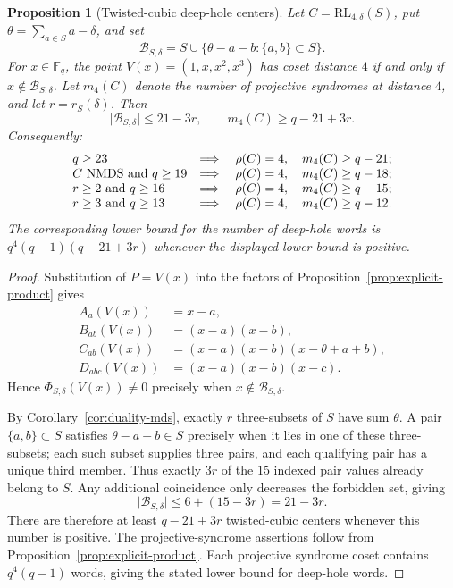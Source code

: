 \documentclass[11pt]{article}
\newcommand{\F}{\mathbb F}
\newcommand{\RL}{\mathrm{RL}}
\theoremstyle{plain}
\newtheorem{proposition}{Proposition}
\theoremstyle{definition}
\begin{document}
\begin{proposition}[Twisted-cubic deep-hole centers]
\label{prop:twisted-centers}
Let \(C=\RL_{4,\delta}(S)\), put
\(\theta=\sum_{a\in S}a-\delta\), and set
\[
 \mathcal{B}_{S,\delta}
 =S\cup\{\theta-a-b:\{a,b\}\subset S\}.
\]
For \(x\in\F_q\), the point \(V(x)=(1,x,x^2,x^3)\) has coset distance
\(4\) if and only if \(x\notin\mathcal{B}_{S,\delta}\).  Let \(m_4(C)\)
denote the number of projective syndromes at distance \(4\), and let
\(r=r_S(\delta)\).  Then
\[
  \lvert\mathcal{B}_{S,\delta}\rvert\le21-3r,\qquad
  m_4(C)\ge q-21+3r.
\]
Consequently:
\[
\begin{array}{ll}
q\ge23&\Longrightarrow\quad \rho(C)=4,\quad
 m_4(C)\ge q-21;\\
C\hbox{ NMDS and }q\ge19&\Longrightarrow\quad \rho(C)=4,\quad
 m_4(C)\ge q-18;\\
r\ge2\hbox{ and }q\ge16&\Longrightarrow\quad \rho(C)=4,\quad
 m_4(C)\ge q-15;\\
r\ge3\hbox{ and }q\ge13&\Longrightarrow\quad \rho(C)=4,\quad
 m_4(C)\ge q-12.
\end{array}
\]
The corresponding lower bound for the number of deep-hole words is
\(q^4(q-1)(q-21+3r)\) whenever the displayed lower bound is positive.
\end{proposition}

\begin{proof}
Substitution of \(P=V(x)\) into the factors of
Proposition~\ref{prop:explicit-product} gives
\[
\begin{aligned}
A_a(V(x))&=x-a,\\
B_{ab}(V(x))&=(x-a)(x-b),\\
C_{ab}(V(x))&=(x-a)(x-b)(x-\theta+a+b),\\
D_{abc}(V(x))&=(x-a)(x-b)(x-c).
\end{aligned}
\]
Hence \(\Phi_{S,\delta}(V(x))\ne0\) precisely when
\(x\notin\mathcal{B}_{S,\delta}\).

By Corollary~\ref{cor:duality-mds}, exactly \(r\) three-subsets of \(S\)
have sum \(\theta\).  A pair \(\{a,b\}\subset S\) satisfies
\(\theta-a-b\in S\) precisely when it lies in one of these three-subsets;
each such subset supplies three pairs, and each qualifying pair has a
unique third member.  Thus exactly \(3r\) of the \(15\) indexed pair values
already belong to \(S\).  Any additional coincidence only decreases the
forbidden set, giving
\[
 \lvert\mathcal{B}_{S,\delta}\rvert\le 6+(15-3r)=21-3r.
\]
There are therefore at least \(q-21+3r\) twisted-cubic centers whenever
this number is positive.  The projective-syndrome assertions follow from
Proposition~\ref{prop:explicit-product}.  Each projective syndrome coset
contains \(q^4(q-1)\) words, giving the stated lower bound for deep-hole
words.
\end{proof}
\end{document}
